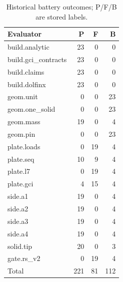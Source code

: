\begin{table}[t]
\caption{Historical battery outcomes; P/F/B are stored labels.}
\centering\small
\begin{tabular}{lrrr}\toprule
Evaluator & P & F & B\\\midrule
build.analytic & 23 & 0 & 0\\
build.gci\_contracts & 23 & 0 & 0\\
build.claims & 23 & 0 & 0\\
build.dolfinx & 23 & 0 & 0\\
geom.unit & 0 & 0 & 23\\
geom.one\_solid & 0 & 0 & 23\\
geom.mass & 19 & 0 & 4\\
geom.pin & 0 & 0 & 23\\
plate.loads & 0 & 19 & 4\\
plate.seq & 10 & 9 & 4\\
plate.l7 & 0 & 19 & 4\\
plate.gci & 4 & 15 & 4\\
side.a1 & 19 & 0 & 4\\
side.a2 & 19 & 0 & 4\\
side.a3 & 19 & 0 & 4\\
side.a4 & 19 & 0 & 4\\
solid.tip & 20 & 0 & 3\\
gate.rs\_v2 & 0 & 19 & 4\\
\midrule
Total & 221 & 81 & 112\\\bottomrule
\end{tabular}
\label{tab:battery}
\end{table}
